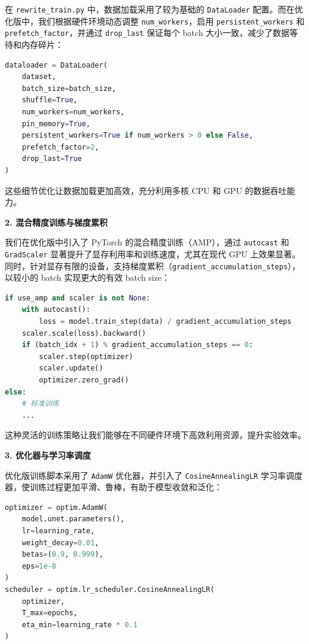 \documentclass{ctexart}
\begin{document}
\noindent
在 \texttt{rewrite\_train.py} 中，数据加载采用了较为基础的 \texttt{DataLoader} 配置。而在优化版中，我们根据硬件环境动态调整 \texttt{num\_workers}，启用 \texttt{persistent\_workers} 和 \texttt{prefetch\_factor}，并通过 \texttt{drop\_last} 保证每个 batch 大小一致，减少了数据等待和内存碎片：

\begin{lstlisting}[language=python]
dataloader = DataLoader(
    dataset,
    batch_size=batch_size,
    shuffle=True,
    num_workers=num_workers,
    pin_memory=True,
    persistent_workers=True if num_workers > 0 else False,
    prefetch_factor=2,
    drop_last=True
)
\end{lstlisting}

\noindent
这些细节优化让数据加载更加高效，充分利用多核 CPU 和 GPU 的数据吞吐能力。

\vspace{0.5em}
\noindent
\textbf{2. 混合精度训练与梯度累积}

\noindent
我们在优化版中引入了 PyTorch 的混合精度训练（AMP），通过 \texttt{autocast} 和 \texttt{GradScaler} 显著提升了显存利用率和训练速度，尤其在现代 GPU 上效果显著。同时，针对显存有限的设备，支持梯度累积（\texttt{gradient\_accumulation\_steps}），以较小的 batch 实现更大的有效 batch size：

\begin{lstlisting}[language=python]
if use_amp and scaler is not None:
    with autocast():
        loss = model.train_step(data) / gradient_accumulation_steps
    scaler.scale(loss).backward()
    if (batch_idx + 1) % gradient_accumulation_steps == 0:
        scaler.step(optimizer)
        scaler.update()
        optimizer.zero_grad()
else:
    # 标准训练
    ...
\end{lstlisting}

这种灵活的训练策略让我们能够在不同硬件环境下高效利用资源，提升实验效率。

\vspace{0.5em}
\noindent
\textbf{3. 优化器与学习率调度}

\noindent
优化版训练脚本采用了 \texttt{AdamW} 优化器，并引入了 \texttt{CosineAnnealingLR} 学习率调度器，使训练过程更加平滑、鲁棒，有助于模型收敛和泛化：

\begin{lstlisting}[language=python]
optimizer = optim.AdamW(
    model.unet.parameters(), 
    lr=learning_rate,
    weight_decay=0.01,
    betas=(0.9, 0.999),
    eps=1e-8
)
scheduler = optim.lr_scheduler.CosineAnnealingLR(
    optimizer, 
    T_max=epochs,
    eta_min=learning_rate * 0.1
)
\end{lstlisting}
\end{document}
